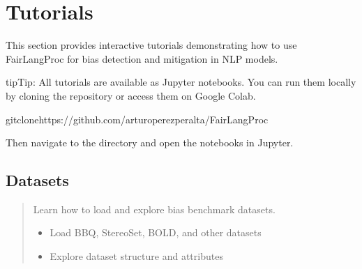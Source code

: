 \documentclass[letterpaper,10pt,english]{sphinxmanual}
\begin{document}
\sphinxstepscope


\chapter{Tutorials}
\label{\detokenize{tutorials:tutorials}}\label{\detokenize{tutorials::doc}}
\sphinxAtStartPar
This section provides interactive tutorials demonstrating how to use FairLangProc
for bias detection and mitigation in NLP models.

\begin{sphinxadmonition}{tip}{Tip:}
\sphinxAtStartPar
All tutorials are available as Jupyter notebooks. You can run them locally by
cloning the repository or access them on Google Colab.

\begin{sphinxVerbatim}[commandchars=\\\{\}]
gitclonehttps://github.com/arturo\PYGZhy{}perez\PYGZhy{}peralta/FairLangProc
\end{sphinxVerbatim}

\sphinxAtStartPar
Then navigate to the  directory and open the notebooks in Jupyter.
\end{sphinxadmonition}


\section{Datasets}
\label{\detokenize{tutorials:datasets}}
\sphinxAtStartPar
{} \sphinxhyphen{} 
\begin{quote}

\sphinxAtStartPar
Learn how to load and explore bias benchmark datasets.
\begin{itemize}
\item {} 
\sphinxAtStartPar
Load BBQ, StereoSet, BOLD, and other datasets

\item {} 
\sphinxAtStartPar
Explore dataset structure and attributes

\end{itemize}
\end{quote}
\end{document}
